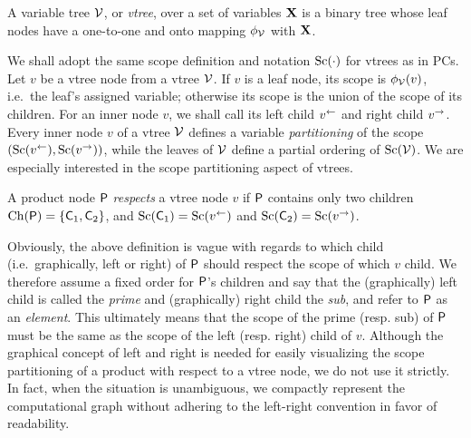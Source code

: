 \begin{definition}[Vtree]
  A variable tree $\operatorname{\mathcal{V}}$, or \emph{vtree}, over a set of variables $\mathbf{X}$ is a binary tree
  whose leaf nodes have a one-to-one and onto mapping $\phi_{\operatorname{\mathcal{V}}}$ with $\mathbf{X}$.
\end{definition}

We shall adopt the same scope definition and notation $\operatorname*{\normalfont{Sc}}(\cdot)$ for vtrees as in PCs. Let $v$ be a
vtree node from a vtree $\operatorname{\mathcal{V}}$. If $v$ is a leaf node, its scope is $\phi_{\operatorname{\mathcal{V}}}(v)$, i.e.\ the
leaf's assigned variable; otherwise its scope is the union of the scope of its children. For an
inner node $v$, we shall call its left child $v^\gets$ and right child $v^\to$. Every inner node
$v$ of a vtree $\operatorname{\mathcal{V}}$ defines a variable \emph{partitioning} of the scope $(\operatorname*{\normalfont{Sc}}(v^\gets),
\operatorname*{\normalfont{Sc}}(v^\to))$, while the leaves of $\operatorname{\mathcal{V}}$ define a partial ordering of $\operatorname*{\normalfont{Sc}}(\operatorname{\mathcal{V}})$. We are
especially interested in the scope partitioning aspect of vtrees.

\begin{definition}
  A product node $\operatorname{\textup{\textsf{P}}}$ \emph{respects} a vtree node $v$ if $\operatorname{\textup{\textsf{P}}}$ contains only two children
  $\operatorname*{\normalfont{Ch}}(\operatorname{\textup{\textsf{P}}})=\{\operatorname{\textup{\textsf{C}}}_1,\operatorname{\textup{\textsf{C}}}_2\}$, and $\operatorname*{\normalfont{Sc}}(\operatorname{\textup{\textsf{C}}}_1)=\operatorname*{\normalfont{Sc}}(v^\gets)$ and $\operatorname*{\normalfont{Sc}}(\operatorname{\textup{\textsf{C}}}_2)=
  \operatorname*{\normalfont{Sc}}(v^\to)$.
\end{definition}

Obviously, the above definition is vague with regards to which child (i.e.\ graphically, left or
right) of $\operatorname{\textup{\textsf{P}}}$ should respect the scope of which $v$ child. We therefore assume a fixed order
for $\operatorname{\textup{\textsf{P}}}$'s children and say that the (graphically) left child is called the \emph{prime} and
(graphically) right child the \emph{sub}, and refer to $\operatorname{\textup{\textsf{P}}}$ as an \emph{element}. This
ultimately means that the scope of the prime (resp. sub) of $\operatorname{\textup{\textsf{P}}}$ must be the same as the scope
of the left (resp. right) child of $v$. Although the graphical concept of left and right is needed
for easily visualizing the scope partitioning of a product with respect to a vtree node, we do not
use it strictly. In fact, when the situation is unambiguous, we compactly represent the
computational graph without adhering to the left-right convention in favor of readability.

